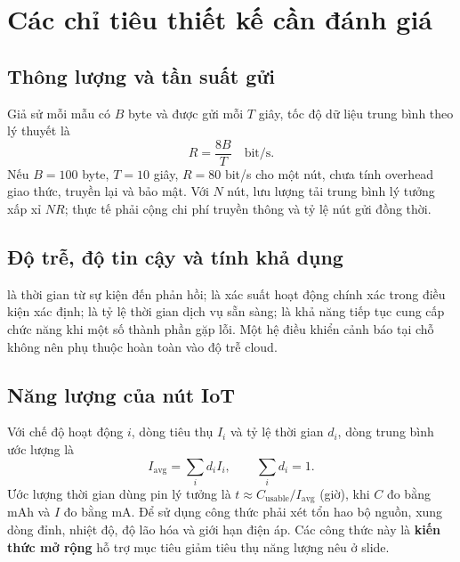 \section{Các chỉ tiêu thiết kế cần đánh giá}
\subsection{Thông lượng và tần suất gửi}
Giả sử mỗi mẫu có $B$ byte và được gửi mỗi $T$ giây, tốc độ dữ liệu trung bình theo lý thuyết là
\[R=\frac{8B}{T}\quad \text{bit/s}.\]
Nếu $B=100$ byte, $T=10$ giây, $R=80$ bit/s cho một nút, chưa tính overhead giao thức, truyền lại và bảo mật. Với $N$ nút, lưu lượng tải trung bình lý tưởng xấp xỉ $NR$; thực tế phải cộng chi phí truyền thông và tỷ lệ nút gửi đồng thời.
\subsection{Độ trễ, độ tin cậy và tính khả dụng}
 là thời gian từ sự kiện đến phản hồi;  là xác suất hoạt động chính xác trong điều kiện xác định;  là tỷ lệ thời gian dịch vụ sẵn sàng;  là khả năng tiếp tục cung cấp chức năng khi một số thành phần gặp lỗi. Một hệ điều khiển cảnh báo tại chỗ không nên phụ thuộc hoàn toàn vào độ trễ cloud.
\subsection{Năng lượng của nút IoT}
Với chế độ hoạt động $i$, dòng tiêu thụ $I_i$ và tỷ lệ thời gian $d_i$, dòng trung bình ước lượng là
\[I_{\mathrm{avg}}=\sum_i d_i I_i,\qquad \sum_i d_i=1.\]
Ước lượng thời gian dùng pin lý tưởng là $t\approx C_{\mathrm{usable}}/I_{\mathrm{avg}}$ (giờ), khi $C$ đo bằng mAh và $I$ đo bằng mA. Để sử dụng công thức phải xét tổn hao bộ nguồn, xung dòng đỉnh, nhiệt độ, độ lão hóa và giới hạn điện áp. Các công thức này là \textbf{kiến thức mở rộng} hỗ trợ mục tiêu giảm tiêu thụ năng lượng nêu ở slide.

